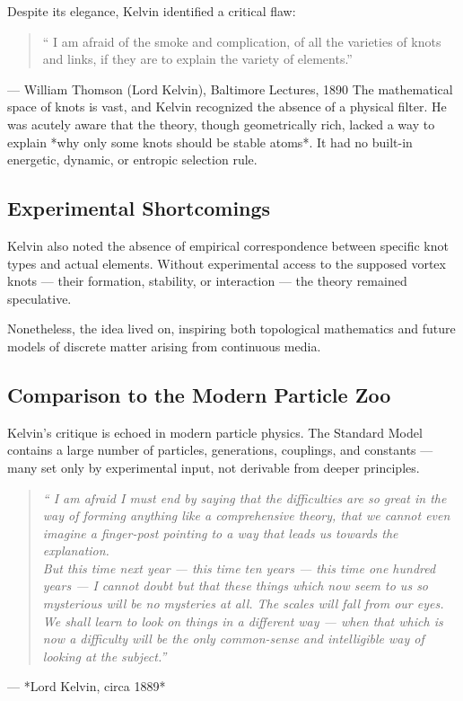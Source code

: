    Despite its elegance, Kelvin identified a critical flaw:

   \begin{quote}
   `` I am afraid of the smoke and complication, of all the varieties of knots and links, if they are to explain the variety of elements.''
   \end{quote}
    \hfill — William Thomson (Lord Kelvin), Baltimore Lectures, 1890
   The mathematical space of knots is vast, and Kelvin recognized the absence of a physical filter. He was acutely aware that the theory, though geometrically rich, lacked a way to explain *why only some knots should be stable atoms*. It had no built-in energetic, dynamic, or entropic selection rule.

   \subsection*{Experimental Shortcomings}

   Kelvin also noted the absence of empirical correspondence between specific knot types and actual elements. Without experimental access to the supposed vortex knots — their formation, stability, or interaction — the theory remained speculative.

   Nonetheless, the idea lived on, inspiring both topological mathematics and future models of discrete matter arising from continuous media.

   \subsection*{Comparison to the Modern Particle Zoo}

   Kelvin's critique is echoed in modern particle physics. The Standard Model contains a large number of particles, generations, couplings, and constants — many set only by experimental input, not derivable from deeper principles.

   \begin{quote}
   \textit{`` I am afraid I must end by saying that the difficulties are so great in the way of forming anything like a comprehensive theory, that we cannot even imagine a finger-post pointing to a way that leads us towards the explanation.} \\
   \textit{But this time next year — this time ten years — this time one hundred years — I cannot doubt but that these things which now seem to us so mysterious will be no mysteries at all. The scales will fall from our eyes. We shall learn to look on things in a different way — when that which is now a difficulty will be the only common-sense and intelligible way of looking at the subject.''}
   \end{quote}
   \begin{flushright}
      — *Lord Kelvin, circa 1889*
   \end{flushright}


